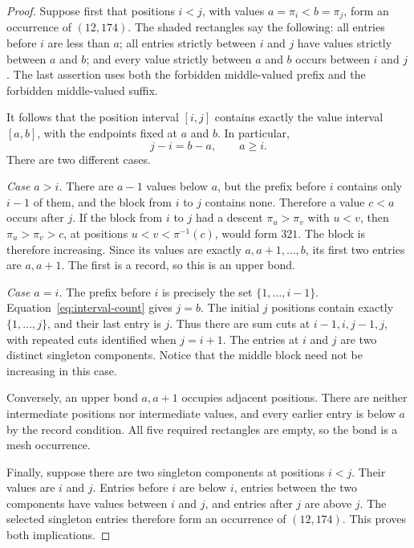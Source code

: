 \documentclass[11pt,a4paper]{article}
\theoremstyle{definition}
\theoremstyle{remark}
\begin{document}
\begin{proof}
Suppose first that positions $i<j$, with values $a=\pi_i<b=\pi_j$, form
an occurrence of $(12,174)$. The shaded rectangles say the following:
all entries before $i$ are less than $a$; all entries strictly between
$i$ and $j$ have values strictly between $a$ and $b$; and every value
strictly between $a$ and $b$ occurs between $i$ and $j$. The last assertion
uses both the forbidden middle-valued prefix and the forbidden middle-valued
suffix.

It follows that the position interval $[i,j]$ contains exactly the value
interval $[a,b]$, with the endpoints fixed at $a$ and $b$. In particular,
\begin{equation}\label{eq:interval-count}
 j-i=b-a,\qquad a\geq i.
\end{equation}
There are two different cases.

\emph{Case $a>i$.} There are $a-1$ values below $a$, but the prefix before
$i$ contains only $i-1$ of them, and the block from $i$ to $j$ contains none.
Therefore a value $c<a$ occurs after $j$. If the block from $i$ to $j$
had a descent $\pi_u>\pi_v$ with $u<v$, then
$\pi_u>\pi_v>c$, at positions $u<v<\pi^{-1}(c)$, would form $321$.
The block is therefore increasing. Since its values are exactly
$a,a+1,\ldots,b$, its first two entries are $a,a+1$. The first is a record,
so this is an upper bond.

\emph{Case $a=i$.} The prefix before $i$ is precisely the set
$\{1,\ldots,i-1\}$. Equation~\eqref{eq:interval-count} gives $j=b$.
The initial $j$ positions contain exactly $\{1,\ldots,j\}$, and their
last entry is $j$. Thus there are sum cuts at $i-1,i,j-1,j$, with repeated
cuts identified when $j=i+1$. The entries at $i$ and $j$ are two distinct
singleton components. Notice that the middle block need not be increasing
in this case.

Conversely, an upper bond $a,a+1$ occupies adjacent positions. There are
neither intermediate positions nor intermediate values, and every earlier
entry is below $a$ by the record condition. All five required rectangles
are empty, so the bond is a mesh occurrence.

Finally, suppose there are two singleton components at positions $i<j$.
Their values are $i$ and $j$. Entries before $i$ are below $i$, entries
between the two components have values between $i$ and $j$, and entries
after $j$ are above $j$. The selected singleton entries therefore form an
occurrence of $(12,174)$. This proves both implications.
\end{proof}
\end{document}
